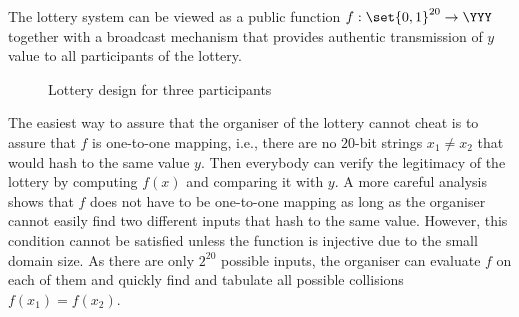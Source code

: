 \documentclass{crypto-exercise}
\begin{document}
\begin{solution}
  The lottery system can be viewed as a public function $f:
  \set{0,1}^{20}\rightarrow \YYY$ together with a broadcast mechanism
  that provides authentic transmission of $y$ value to all
  participants of the lottery.
  \begin{figure}[h]
    \caption{Lottery design for three participants}
    \label{fig:0101:electronic-lottery}
  \end{figure}
 

  The easiest way to assure that the organiser of the lottery cannot
  cheat is to assure that $f$ is one-to-one mapping, i.e., there are
  no $20$-bit strings $x_1\neq x_2$ that would hash to the same value
  $y$. Then everybody can verify the legitimacy of the lottery by
  computing $f(x)$ and comparing it with $y$. A more careful analysis
  shows that $f$ does not have to be one-to-one mapping as long as the
  organiser cannot easily find two different inputs that hash to the
  same value. However, this condition cannot be satisfied unless the
  function is injective due to the small domain size. As there are
  only $2^{20}$ possible inputs, the organiser can evaluate $f$ on
  each of them and quickly find and tabulate all possible collisions
  $f(x_1)=f(x_2)$.
 

\end{solution}
\end{document}
